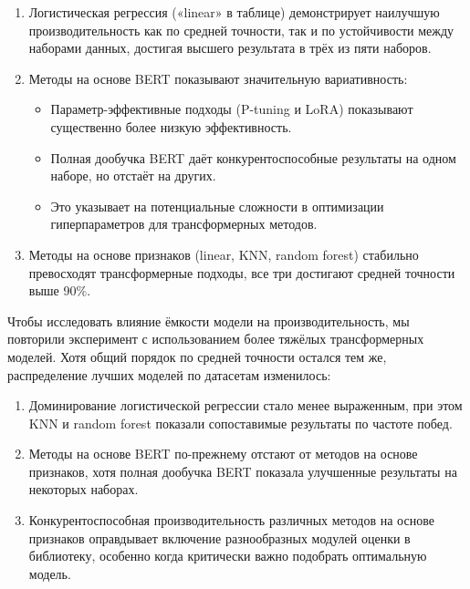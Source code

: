 \documentclass[14pt,a4paper,oneside,openany]{extbook}
\begin{document}
\begin{enumerate}
\item Логистическая регрессия («linear» в таблице) демонстрирует наилучшую производительность как по средней точности, так и по устойчивости между наборами данных, достигая высшего результата в трёх из пяти наборов.
\item Методы на основе BERT показывают значительную вариативность:
\begin{itemize}
\item Параметр-эффективные подходы (P-tuning и LoRA) показывают существенно более низкую эффективность.
\item Полная дообучка BERT даёт конкурентоспособные результаты на одном наборе, но отстаёт на других.
\item Это указывает на потенциальные сложности в оптимизации гиперпараметров для трансформерных методов.
\end{itemize}
\item Методы на основе признаков (linear, KNN, random forest) стабильно превосходят трансформерные подходы, все три достигают средней точности выше 90\%.
\end{enumerate}


Чтобы исследовать влияние ёмкости модели на производительность, мы повторили эксперимент с использованием более тяжёлых трансформерных моделей. Хотя общий порядок по средней точности остался тем же, распределение лучших моделей по датасетам изменилось:

\begin{enumerate}
\item Доминирование логистической регрессии стало менее выраженным, при этом KNN и random forest показали сопоставимые результаты по частоте побед.
\item Методы на основе BERT по-прежнему отстают от методов на основе признаков, хотя полная дообучка BERT показала улучшенные результаты на некоторых наборах.
\item Конкурентоспособная производительность различных методов на основе признаков оправдывает включение разнообразных модулей оценки в библиотеку, особенно когда критически важно подобрать оптимальную модель.
\end{enumerate}
\end{document}
